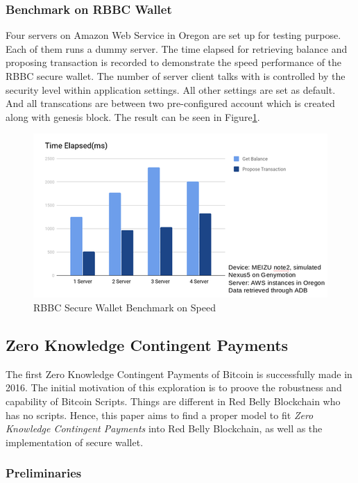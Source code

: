 \documentclass[12pt]{article}
\begin{document}
\subsubsection{Benchmark on RBBC Wallet}

Four servers on Amazon Web Service in Oregon are set up for testing purpose. Each of them runs a dummy server. The time elapsed for retrieving balance and proposing transaction is recorded to demonstrate the speed performance of the RBBC secure wallet. The number of server client talks with is controlled by the security level within application settings. All other settings are set as default. And all transcations are between two pre-configured account which is created along with genesis block. The result can be seen in Figure\ref{fig:benchmark}.

\begin{figure}
   \includegraphics{benchmark.png}
   \caption{RBBC Secure Wallet Benchmark on Speed}
   \label{fig:benchmark} 
\end{figure}

\subsection{Zero Knowledge Contingent Payments}

The first Zero Knowledge Contingent Payments of Bitcoin is successfully made in 2016. The initial motivation of this exploration is to proove the robustness and capability of Bitcoin Scripts. Things are different in Red Belly Blockchain who has no scripts. Hence, this paper aims to find a proper model to fit \textit{Zero Knowledge Contingent Payments} into Red Belly Blockchain, as well as the implementation of secure wallet.

\subsubsection{Preliminaries}
\end{document}

